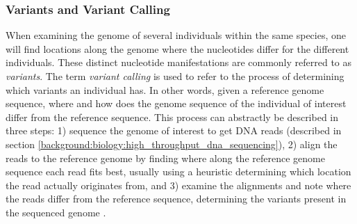 \subsubsection{Variants and Variant Calling} \label{background:biology:variants_and_variant_calling}
When examining the genome of several individuals within the same species, one will find locations along the genome where the nucleotides differ for the different individuals.
These distinct nucleotide manifestations are commonly referred to as \textit{variants}.
The term \textit{variant calling} is used to refer to the process of determining which variants an individual has.
In other words, given a reference genome sequence, where and how does the genome sequence of the individual of interest differ from the reference sequence.
This process can abstractly be described in three steps: 
1) sequence the genome of interest to get DNA reads (described in section \ref{background:biology:high_throughput_dna_sequencing}), 
2) align the reads to the reference genome by finding where along the reference genome sequence each read fits best, usually using a heuristic determining which location the read actually originates from, and 
3) examine the alignments and note where the reads differ from the reference sequence, determining the variants present in the sequenced genome \cite{variant_calling}.


